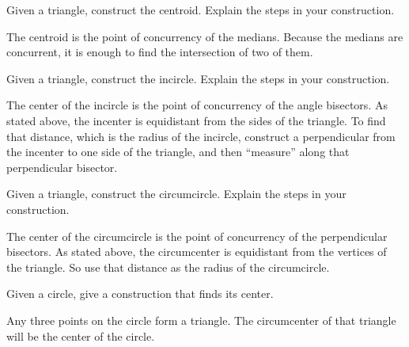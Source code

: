 \documentclass[nooutcomes]{ximera}
\begin{document}
\begin{problem}
Given a triangle, construct the centroid. Explain the steps in
  your construction.
\begin{freeResponse}
\begin{hint}
The centroid is the point of concurrency of the medians.  Because the medians are concurrent, it is enough to find the intersection of two of them.  
\end{hint}
\end{freeResponse}
\end{problem}

\begin{problem}
Given a triangle, construct the incircle. Explain the steps in
  your construction.
\begin{freeResponse}
\begin{hint}
The center of the incircle is the point of concurrency of the angle bisectors.  As stated above, the incenter is equidistant from the sides of the triangle.  To find that distance, which is the radius of the incircle, construct a perpendicular from the incenter to one side of the triangle, and then ``measure'' along that perpendicular bisector. 
\end{hint}
\end{freeResponse}
\end{problem}

\begin{problem}
Given a triangle, construct the circumcircle. Explain the steps
  in your construction.
\begin{freeResponse}
\begin{hint}
The center of the circumcircle is the point of concurrency of the perpendicular bisectors.  As stated above, the circumcenter is equidistant from the vertices of the triangle.  So use that distance as the radius of the circumcircle.  
\end{hint}
\end{freeResponse}
\end{problem}

\begin{problem}
Given a circle, give a construction that finds its center. 
\begin{freeResponse}
\begin{hint}
Any three points on the circle form a triangle.  The circumcenter of that triangle will be the center of the circle.  
\end{hint}
\end{freeResponse}
\end{problem}
\end{document}
